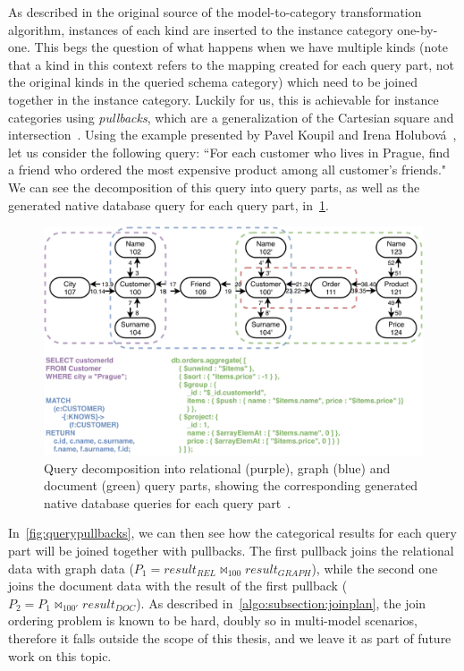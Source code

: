 As described in the original source of the model-to-category transformation algorithm, instances of each kind are inserted to the instance category one-by-one.
This begs the question of what happens when we have multiple kinds (note that a kind in this context refers to the mapping created for each query part, not the original kinds in the queried schema category) which need to be joined together in the instance category.
Luckily for us, this is achievable for instance categories using \textit{pullbacks}, which are a generalization of the Cartesian square and intersection~\cite{pullbacks}\cite{multi_model_new_next}.
Using the example presented by Pavel Koupil and Irena Holubov{\'a}~\cite{unified_representation}, let us consider the following query: “For each customer who lives in Prague, find a friend who ordered the most expensive product among all customer’s friends."
We can see the decomposition of this query into query parts, as well as the generated native database query for each query part, in~\cref{fig:querydecomposition}.

\begin{figure}
\centering
\includegraphics[width=\textwidth]{img/fig_query-decomposition.pdf} 
\caption{Query decomposition into relational (purple), graph (blue) and document (green) query parts, showing the corresponding generated native database queries for each query part~\cite{unified_representation}.}
\label{fig:querydecomposition}
\end{figure}

In~\cref{fig:querypullbacks}, we can then see how the categorical results for each query part will be joined together with pullbacks.
The first pullback joins the relational data with graph data ($P_1 = result_{REL} \bowtie_{100} result_{GRAPH}$), while the second one joins the document data with the result of the first pullback ($P_2 = P_1 \bowtie_{100'} result_{DOC}$).
As described in~\cref{algo:subsection:joinplan}, the join ordering problem is known to be hard, doubly so in multi-model scenarios, therefore it falls outside the scope of this thesis, and we leave it as part of future work on this topic.

